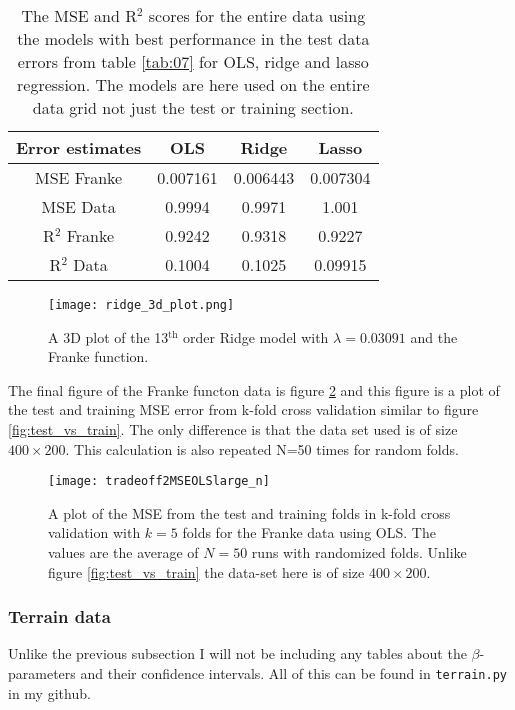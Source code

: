 \documentclass[uio,jmp,amsmath,amssymb,reprint,nofootinbib]{revtex4-1}
\numberwithin{equation}{section}
\begin{document}
\begin{table}
\begin{tabular}{|c|c|c|c|}\hline
Error estimates & OLS & Ridge & Lasso \\ \hline
MSE Franke & 0.007161 & 0.006443 & 0.007304 \\ \hline
MSE Data & 0.9994 & 0.9971 & 1.001 \\ \hline
R\(^2\) Franke & 0.9242 & 0.9318 & 0.9227 \\ \hline
R\(^2\) Data & 0.1004 & 0.1025 & 0.09915 \\ \hline
\end{tabular}
\caption{The MSE and R\(^2\) scores for the entire data using the models with best performance in the test data errors from table \ref{tab:07} for OLS, ridge and lasso regression. The models are here used on the entire data grid not just the test or training section.}
\label{tab:07_2}
\end{table}


\begin{figure}[H]
    \centering
    \texttt{[image: ridge\_3d\_plot.png]}
    \caption{A 3D plot of the 13\(^\text{th}\) order Ridge model with \(\lambda = 0.03091\) and the Franke function.}
    \label{fig:ridge_3d}
\end{figure}

The final figure of the Franke functon data is figure \ref{fig:test_vs_trainlarge_n} and this figure is a plot of the test and training MSE error from k-fold cross validation similar to figure \ref{fig:test_vs_train}. The only difference is that the data set used is of size \(400\times 200\). This calculation is also repeated N=50 times for random folds.

\begin{figure}[H]
    \centering
    \texttt{[image: tradeoff2MSEOLSlarge\_n]}
    \caption{A plot of the MSE from the test and training folds in k-fold cross validation with \(k=5\) folds for the Franke data using OLS. The values are the average of \(N=50\) runs with randomized folds. Unlike figure \ref{fig:test_vs_train} the data-set here is of size \(400\times 200\).}
    \label{fig:test_vs_trainlarge_n}
\end{figure}

\subsubsection{Terrain data}

Unlike the previous subsection I will not be including any tables about the \(\beta\)-parameters and their confidence intervals. All of this can be found in \texttt{terrain.py} in my github. 
\end{document}
